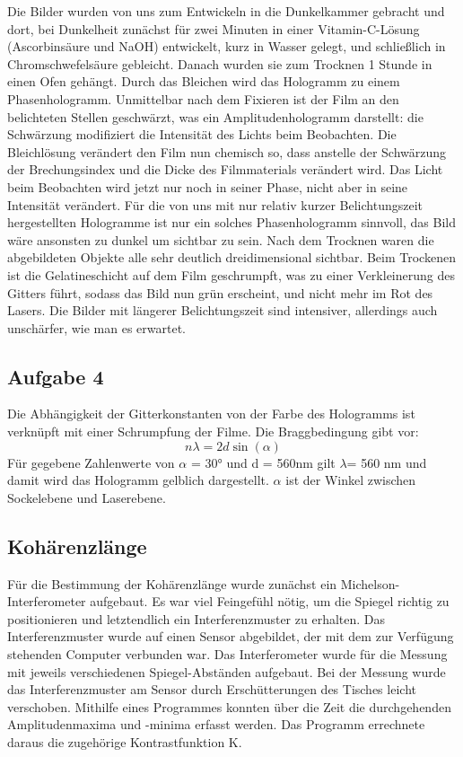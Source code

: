 \documentclass[12pt,a4paper]{article}
\begin{document}
Die Bilder wurden von uns zum Entwickeln in die Dunkelkammer gebracht und dort, bei Dunkelheit zunächst für zwei Minuten in einer Vitamin-C-Lösung (Ascorbinsäure und NaOH) entwickelt, kurz in Wasser gelegt, und schließlich in Chromschwefelsäure gebleicht. Danach wurden sie zum Trocknen 1 Stunde in einen Ofen gehängt. Durch das Bleichen wird das Hologramm zu einem Phasenhologramm. 
Unmittelbar nach dem Fixieren ist der Film an den belichteten Stellen geschwärzt, was ein Amplitudenhologramm darstellt: die Schwärzung modifiziert die Intensität des Lichts beim Beobachten. Die Bleichlösung verändert den Film nun 
chemisch so, dass anstelle der Schwärzung der Brechungsindex und die Dicke des Filmmaterials verändert wird. Das Licht beim Beobachten wird jetzt nur noch in seiner Phase, nicht aber in seine Intensität verändert. Für die von uns mit nur relativ kurzer Belichtungszeit hergestellten Hologramme ist nur ein solches Phasenhologramm sinnvoll, das Bild wäre ansonsten zu dunkel um sichtbar zu sein. Nach dem Trocknen waren die abgebildeten Objekte alle sehr deutlich dreidimensional sichtbar. Beim Trockenen ist die Gelatineschicht auf dem Film geschrumpft, was zu einer Verkleinerung des Gitters führt, sodass das Bild nun grün erscheint, und nicht mehr im Rot des Lasers. Die Bilder mit längerer Belichtungszeit sind intensiver, allerdings auch unschärfer, wie man es erwartet.


\subsection{Aufgabe 4}
Die Abhängigkeit der Gitterkonstanten von der Farbe des Hologramms ist verknüpft mit einer Schrumpfung der Filme.
Die Braggbedingung gibt vor:
\begin{equation}
n \lambda= 2d \sin(\alpha) 
\end{equation}
Für gegebene Zahlenwerte von $\alpha $ = 30° und d = 560nm gilt $\lambda$= 560 nm und damit wird das Hologramm gelblich dargestellt. $\alpha $ ist der Winkel zwischen Sockelebene und Laserebene.


\subsection{Kohärenzlänge}

Für die Bestimmung der Kohärenzlänge wurde zunächst ein Michelson-Interferometer aufgebaut. Es war viel Feingefühl nötig, um die Spiegel richtig zu positionieren und letztendlich ein Interferenzmuster zu erhalten. Das Interferenzmuster wurde auf einen Sensor abgebildet, der mit dem zur Verfügung stehenden Computer verbunden war. Das Interferometer wurde für die Messung mit jeweils verschiedenen Spiegel-Abständen aufgebaut. Bei der Messung wurde das Interferenzmuster am Sensor durch Erschütterungen des Tisches leicht verschoben. Mithilfe eines Programmes konnten über die Zeit die durchgehenden Amplitudenmaxima und -minima erfasst werden. Das Programm errechnete daraus die zugehörige Kontrastfunktion K. 
\end{document}

